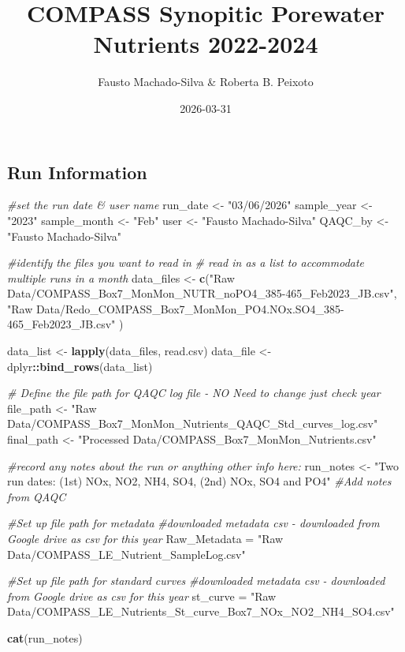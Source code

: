 \documentclass[
]{article}
\title{COMPASS Synopitic Porewater Nutrients 2022-2024}
\author{Fausto Machado-Silva \& Roberta B. Peixoto}
\date{2026-03-31}
\newenvironment{Shaded}{\begin{snugshade}}{\end{snugshade}}
\newcommand{\CommentTok}[1]{\textcolor[rgb]{0.56,0.35,0.01}{\textit{#1}}}
\newcommand{\FunctionTok}[1]{\textcolor[rgb]{0.13,0.29,0.53}{\textbf{#1}}}
\newcommand{\NormalTok}[1]{#1}
\newcommand{\OtherTok}[1]{\textcolor[rgb]{0.56,0.35,0.01}{#1}}
\newcommand{\SpecialCharTok}[1]{\textcolor[rgb]{0.81,0.36,0.00}{\textbf{#1}}}
\newcommand{\StringTok}[1]{\textcolor[rgb]{0.31,0.60,0.02}{#1}}
\begin{document}
\maketitle

{
\setcounter{tocdepth}{2}
\tableofcontents
}
\newpage

\subsection{Run Information}\label{run-information}

\begin{Shaded}
\begin{Highlighting}[]
\CommentTok{\#set the run date \& user name }
\NormalTok{  run\_date }\OtherTok{\textless{}{-}} \StringTok{"03/06/2026"}
\NormalTok{  sample\_year }\OtherTok{\textless{}{-}} \StringTok{"2023"}
\NormalTok{  sample\_month }\OtherTok{\textless{}{-}} \StringTok{"Feb"}
\NormalTok{  user }\OtherTok{\textless{}{-}} \StringTok{"Fausto Machado{-}Silva"}
\NormalTok{  QAQC\_by }\OtherTok{\textless{}{-}} \StringTok{"Fausto Machado{-}Silva"}

\CommentTok{\#identify the files you want to read in }
  \CommentTok{\# read in as a list to accommodate multiple runs in a month}
\NormalTok{  data\_files }\OtherTok{\textless{}{-}} \FunctionTok{c}\NormalTok{(}\StringTok{"Raw Data/COMPASS\_Box7\_MonMon\_NUTR\_noPO4\_385{-}465\_Feb2023\_JB.csv"}\NormalTok{, }
                  \StringTok{"Raw Data/Redo\_COMPASS\_Box7\_MonMon\_PO4.NOx.SO4\_385{-}465\_Feb2023\_JB.csv"}
\NormalTok{                  )}

\NormalTok{  data\_list }\OtherTok{\textless{}{-}} \FunctionTok{lapply}\NormalTok{(data\_files, read.csv)}
\NormalTok{  data\_file }\OtherTok{\textless{}{-}}\NormalTok{ dplyr}\SpecialCharTok{::}\FunctionTok{bind\_rows}\NormalTok{(data\_list)}

  
\CommentTok{\# Define the file path for QAQC log file {-} NO Need to change just check year }
\NormalTok{  file\_path }\OtherTok{\textless{}{-}} \StringTok{"Raw Data/COMPASS\_Box7\_MonMon\_Nutrients\_QAQC\_Std\_curves\_log.csv"}
\NormalTok{  final\_path }\OtherTok{\textless{}{-}} \StringTok{"Processed Data/COMPASS\_Box7\_MonMon\_Nutrients.csv"}

\CommentTok{\#record any notes about the run or anything other info here: }
\NormalTok{  run\_notes }\OtherTok{\textless{}{-}} \StringTok{"Two run dates: (1st) NOx, NO2, NH4, SO4, (2nd) NOx, SO4 and PO4"} \CommentTok{\#Add notes from QAQC}
  
\CommentTok{\#Set up file path for metadata }
  \CommentTok{\#downloaded metadata csv {-} downloaded from Google drive as csv for this year}
\NormalTok{  Raw\_Metadata }\OtherTok{=} \StringTok{"Raw Data/COMPASS\_LE\_Nutrient\_SampleLog.csv"}
  
\CommentTok{\#Set up file path for standard curves }
  \CommentTok{\#downloaded metadata csv {-} downloaded from Google drive as csv for this year}
\NormalTok{  st\_curve }\OtherTok{=} \StringTok{"Raw Data/COMPASS\_LE\_Nutrients\_St\_curve\_Box7\_NOx\_NO2\_NH4\_SO4.csv"}

  \FunctionTok{cat}\NormalTok{(run\_notes)}
\end{Highlighting}
\end{Shaded}
\end{document}
